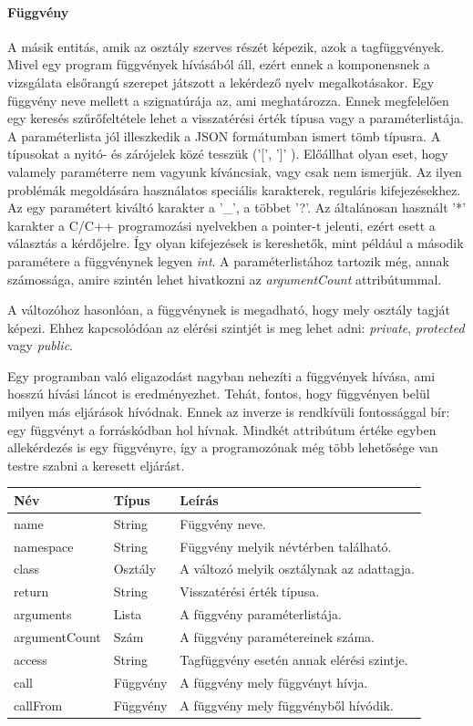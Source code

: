 \documentclass[a4paper,12pt]{report}
\begin{document}
\paragraph{Függvény}
A másik entitás, amik az osztály szerves részét képezik, azok a tagfüggvények. Mivel egy program függvények hívásából áll, ezért ennek a komponensnek a vizsgálata elsőrangú szerepet játszott a lekérdező nyelv megalkotásakor. Egy függvény neve mellett a szignatúrája az, ami meghatározza. Ennek megfelelően egy keresés szűrőfeltétele lehet a visszatérési érték típusa vagy a paraméterlistája. A paraméterlista jól illeszkedik a JSON formátumban ismert tömb típusra. A típusokat a nyitó- és zárójelek közé tesszük ('[', ']' ). Előállhat olyan eset, hogy valamely paraméterre nem vagyunk kíváncsiak, vagy csak nem ismerjük. Az ilyen problémák megoldására használatos speciális karakterek, reguláris kifejezésekhez. Az egy paramétert kiváltó karakter a '\_', a többet '?'. Az általánosan használt '*' karakter a C/C++ programozási nyelvekben a pointer-t jelenti, ezért esett a választás a kérdőjelre. Így olyan kifejezések is kereshetők, mint például a második paramétere a függvénynek legyen \textit{int}. A paraméterlistához tartozik még, annak számossága, amire szintén lehet hivatkozni az \textit{argumentCount} attribútummal.
\par A változóhoz hasonlóan, a függvénynek is megadható, hogy mely osztály tagját képezi. Ehhez kapcsolódóan az elérési szintjét is meg lehet adni: \textit{private}, \textit{protected} vagy \textit{public}.
\par Egy programban való eligazodást nagyban nehezíti a függvények hívása, ami hosszú hívási láncot is eredményezhet. Tehát, fontos, hogy függvényen belül milyen más eljárások hívódnak. Ennek az inverze is rendkívüli fontossággal bír: egy függvényt a forráskódban hol hívnak. Mindkét attribútum értéke egyben allekérdezés is egy függvényre, így a programozónak még több lehetősége van testre szabni a keresett eljárást.
\begin{center}
	\begin{tabular}{| l | l | l |}
		\hline
		Név & Típus & Leírás \\ \hline
		name & String & Függvény neve. \\ \hline
		namespace & String & Függvény melyik névtérben található. \\ \hline
		class & Osztály & A változó melyik osztálynak az adattagja. \\ \hline
		return & String & Visszatérési érték típusa. \\ \hline
		arguments & Lista & A függvény paraméterlistája. \\ \hline
		argumentCount & Szám & A függvény paramétereinek száma. \\ \hline
		access & String & Tagfüggvény esetén annak elérési szintje. \\ \hline
		call & Függvény & A függvény mely függvényt hívja. \\ \hline
		callFrom & Függvény & A függvény mely függvényből hívódik. \\ \hline
	\end{tabular}
\end{center}
\end{document}
